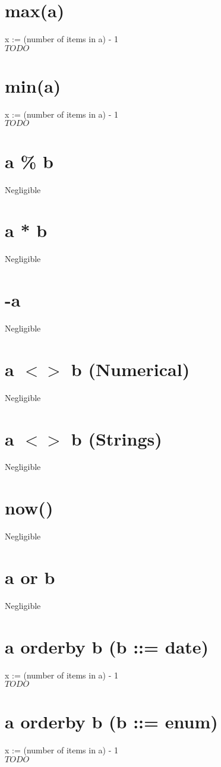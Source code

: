 \documentclass[12pt]{article}
\begin{document}
	\section{max(a)}
	x := (number of items in a) - 1\\
	$TODO$
	
	\section{min(a)}
	x := (number of items in a) - 1\\
	$TODO$
	
	\section{a \% b}
	Negligible
	
	\section{a * b}
	Negligible
	
	\section{-a}
	Negligible
	
	\section{a $<>$ b (Numerical)}
	Negligible
	
	\section{a $<>$ b (Strings)}
	Negligible
	
	\section{now()}
	Negligible
	
	\section{a or b}
	Negligible
	
	\section{a orderby b (b ::= date)}
	x := (number of items in a) - 1\\
	$TODO$
	
	\section{a orderby b (b ::= enum)}
	x := (number of items in a) - 1\\
	$TODO$
	
\end{document}
